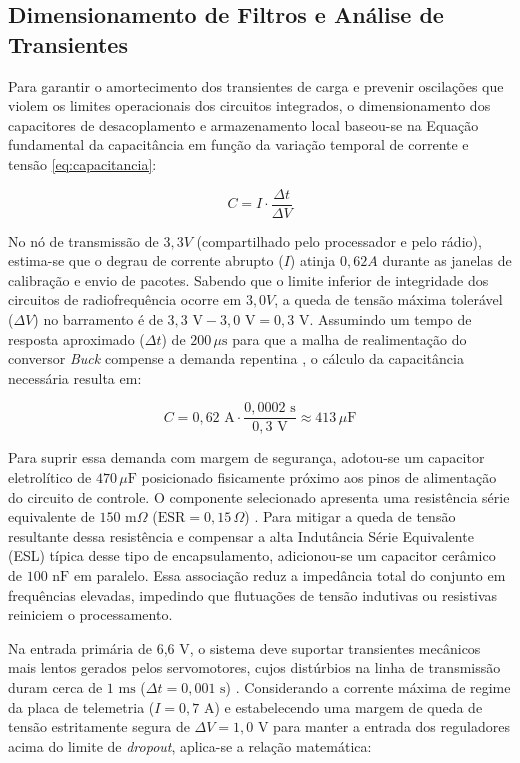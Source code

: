 \subsection{Dimensionamento de Filtros e Análise de Transientes}

Para garantir o amortecimento dos transientes de carga e prevenir oscilações que violem os limites operacionais dos circuitos integrados, o dimensionamento dos capacitores de desacoplamento e armazenamento local baseou-se na Equação fundamental da capacitância em função da variação temporal de corrente e tensão \ref{eq:capacitancia}:

\begin{equation}
  C = I \cdot \frac{\Delta t}{\Delta V}
  \label{eq:capacitancia}
\end{equation}

No nó de transmissão de $3,3 V$ (compartilhado pelo processador e pelo rádio), estima-se que o degrau de corrente abrupto ($I$) atinja $0,62 A$ durante as janelas de calibração e envio de pacotes. Sabendo que o limite inferior de integridade dos circuitos de radiofrequência ocorre em $3,0 V$, a queda de tensão máxima tolerável ($\Delta V$) no barramento é de $3,3\text{ V} - 3,0\text{ V} = 0,3\text{ V}$. Assumindo um tempo de resposta aproximado ($\Delta t$) de $200\,\mu\text{s}$ para que a malha de realimentação do conversor \textit{Buck} compense a demanda repentina \cite{mini360_datasheet}, o cálculo da capacitância necessária resulta em:

$$C = 0,62\text{ A} \cdot \frac{0,0002\text{ s}}{0,3\text{ V}} \approx 413\,\mu\text{F}$$

Para suprir essa demanda com margem de segurança, adotou-se um capacitor eletrolítico de $470\,\mu\text{F}$ posicionado fisicamente próximo aos pinos de alimentação do circuito de controle. O componente selecionado apresenta uma resistência série equivalente de $150\text{ m}\Omega$ ($\text{ESR} = 0,15\,\Omega$) \cite{the_art_of_electronics}. Para mitigar a queda de tensão resultante dessa resistência e compensar a alta Indutância Série Equivalente (ESL) típica desse tipo de encapsulamento, adicionou-se um capacitor cerâmico de $100\text{ nF}$ em paralelo. Essa associação reduz a impedância total do conjunto em frequências elevadas, impedindo que flutuações de tensão indutivas ou resistivas reiniciem o processamento.

Na entrada primária de 6,6 V, o sistema deve suportar transientes mecânicos mais lentos gerados pelos servomotores, cujos distúrbios na linha de transmissão duram cerca de $1\text{ ms}$ ($\Delta t = 0,001\text{ s}$) \cite{electromagnetic_compatibility_engineering}. Considerando a corrente máxima de regime da placa de telemetria ($I = 0,7\text{ A}$) e estabelecendo uma margem de queda de tensão estritamente segura de $\Delta V = 1,0\text{ V}$ para manter a entrada dos reguladores acima do limite de \textit{dropout}, aplica-se a relação matemática:

